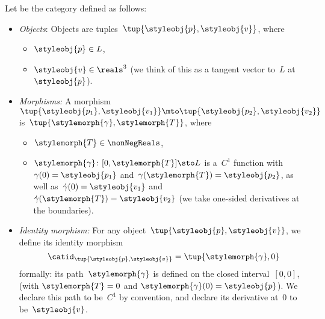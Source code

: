 \begin{definition}[\Berg]
    \label{def:Berg}
    Let \Berg be the category defined as follows:
    \begin{itemize}
        \item \emph{Objects}: Objects are tuples~$\tup{\styleobj{p},\styleobj{v}}$, where
              \begin{itemize}
                  \item $\styleobj{p} \in L$,
                  \item $\styleobj{v} \in \reals^3$ (we think of this as a tangent vector to~$L$ at~$\styleobj{p}$).
              \end{itemize}

        \item \emph{Morphisms:}
              A morphism~$\tup{\styleobj{p_1}, \styleobj{v_1}} \mto \tup{\styleobj{p_2}, \styleobj{v_2}}$ is~$\tup{\stylemorph{\gamma}, \stylemorph{T}}$,
              where
              \begin{itemize}
                  \item $\stylemorph{T} \in \nonNegReals$,
                  \item $\stylemorph{\gamma} \colon [0, \stylemorph{T}] \sto L$ is a~$C^1$ function with~$\gamma(0)=\styleobj{p_1}$ and~$\gamma(\stylemorph{T})=\styleobj{p_2}$, as well as~$\dot \gamma(0) = \styleobj{v_1}$ and~$\dot \gamma(\stylemorph{T}) = \styleobj{v_2}$  (we take one-sided derivatives at the boundaries).
              \end{itemize}
        \item \emph{Identity morphism:}
              For any object~$\tup{\styleobj{p}, \styleobj{v}}$, we define its identity morphism
              \begin{equation}
                  \catid_{\tup{\styleobj{p},\styleobj{v}}} = \tup{\stylemorph{\gamma}, 0}
              \end{equation}
              formally: its path~$\stylemorph{\gamma}$ is defined on the closed interval~$[0,0]$, (with $\stylemorph{T}=0$ and $\stylemorph{\gamma}(0) = \styleobj{p}$).
              We declare this path to be~$C^1$ by convention, and declare its derivative at~$0$ to be~$\styleobj{v}$.


\end{itemize}
\end{definition}
